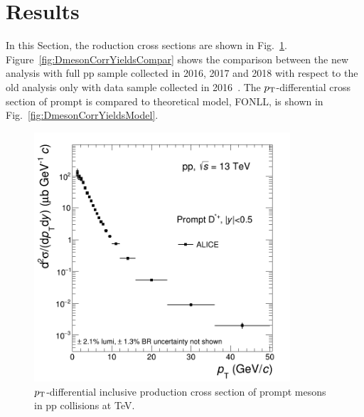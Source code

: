 \linenumbers

\section{Results}


In this Section, the \Dstar roduction cross sections are shown in Fig.~\ref{fig:DmesonCorrYields}. Figure~\ref{fig:DmesonCorrYieldsCompar} shows the comparison between the new analysis with full pp sample collected in 2016, 2017 and 2018 with respect to the old analysis only with data sample collected in 2016~\cite{Ana:pp2016}. The $p_{\rm T}$-differential cross section of prompt \Dstar is compared to theoretical model, FONLL, is shown in Fig.~\ref{fig:DmesonCorrYieldsModel}.


\begin{figure}[htbp]
\begin{center}
\includegraphics[width=0.85\textwidth]{figures/Dstar/pp13TeV/cross-setion-pp13TeV.png}
\caption{$p_{\rm T}$-differential inclusive production cross section of prompt \Dstar mesons in pp collisions at  TeV.} 
\label{fig:DmesonCorrYields}
\end{center}
\end{figure}



